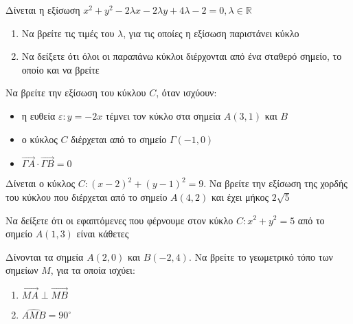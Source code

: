 \documentclass{../../presentation}
\begin{document}
\begin{askisi}
  Δίνεται η εξίσωση $x^2+y^2-2λx-2λy+4λ-2=0,λ\in\mathbb{R}$
  \begin{enumerate}
    \item<1-> Να βρείτε τις τιμές του $λ$, για τις οποίες η εξίσωση παριστάνει κύκλο
    \item<2-> Να δείξετε ότι όλοι οι παραπάνω κύκλοι διέρχονται από ένα σταθερό σημείο, το οποίο και να βρείτε
  \end{enumerate}

\end{askisi}

\begin{askisi}
  Να βρείτε την εξίσωση του κύκλου $C$, όταν ισχύουν:
  \begin{itemize}
    \item η ευθεία $ε:y=-2x$ τέμνει τον κύκλο στα σημεία $Α(3,1)$ και $Β$
    \item ο κύκλος $C$ διέρχεται από το σημείο $Γ(-1,0)$
    \item $\overrightarrow{ΓΑ}\cdot\overrightarrow{ΓΒ}=0$
  \end{itemize}

\end{askisi}

\begin{askisi}
  Δίνεται ο κύκλος $C:(x-2)^2+(y-1)^2=9$. Να βρείτε την εξίσωση της χορδής του κύκλου που διέρχεται από το σημείο $Α(4,2)$ και έχει μήκος $2\sqrt{5}$

\end{askisi}

\begin{askisi}
  Να δείξετε ότι οι εφαπτόμενες που φέρνουμε στον κύκλο $C:x^2+y^2=5$ από το σημείο $Α(1,3)$ είναι κάθετες

\end{askisi}

\begin{askisi}
  Δίνονται τα σημεία $Α(2,0)$ και $Β(-2,4)$. Να βρείτε το γεωμετρικό τόπο των σημείων $Μ$, για τα οποία ισχύει:
  \begin{enumerate}
    \item<1-> $\overrightarrow{ΜΑ}\perp\overrightarrow{ΜΒ}$
    \item<2-> $\widehat{ΑΜΒ}=90^{\circ}$
  \end{enumerate}

\end{askisi}
\end{document}
